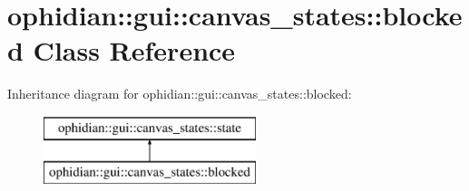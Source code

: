 \hypertarget{classophidian_1_1gui_1_1canvas__states_1_1blocked}{\section{ophidian\-:\-:gui\-:\-:canvas\-\_\-states\-:\-:blocked Class Reference}
\label{classophidian_1_1gui_1_1canvas__states_1_1blocked}
}
Inheritance diagram for ophidian\-:\-:gui\-:\-:canvas\-\_\-states\-:\-:blocked\-:\begin{figure}[H]
\begin{center}
\leavevmode
\includegraphics[height=2.000000cm]{classophidian_1_1gui_1_1canvas__states_1_1blocked}
\end{center}
\end{figure}
